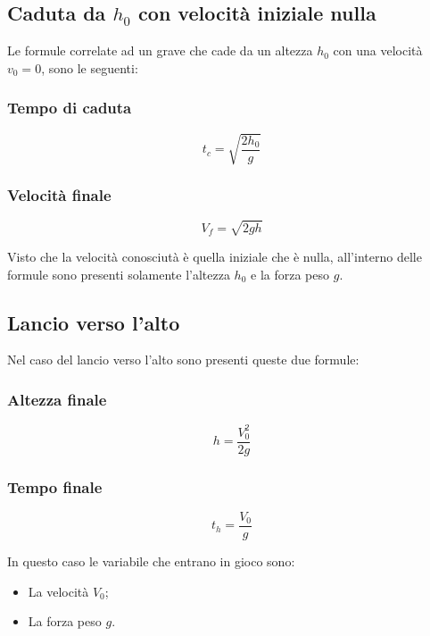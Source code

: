 \documentclass{book}
\begin{document}
\subsection{Caduta da $h_0$ con velocità iniziale nulla}
Le formule correlate ad un grave che cade da un altezza $h_0$ con una velocità $v_0=0$, sono le seguenti:
\label{sec:cadutadahconvelzero}
\begin{multicols}{2}
  \subsubsection{Tempo di caduta}
  \label{sec:tempcad}
  \begin{equation}
    \label{eq:tempcad}
    t_c=\sqrt{\frac{2h_0}{g}}
  \end{equation}
  \subsubsection{Velocità finale}
  \label{sec:velFin}
  \begin{equation}
    \label{eq:velfin}
    V_f=\sqrt{2gh}
  \end{equation}
\end{multicols}
Visto che la velocità conosciutà è quella iniziale che è nulla, all'interno delle formule sono presenti solamente l'altezza $h_0$ e la forza peso $g$.

\subsection{Lancio verso l'alto}
\label{sec:lancioversolalto}
Nel caso del lancio verso l'alto sono presenti queste due formule:
\begin{multicols}{2}
  \subsubsection{Altezza finale}
  \label{sec:altfinlancioversalt}
  \begin{equation}
    \label{eq:altfinlancioversalt}
    h=\frac{V_0^2}{2g}
  \end{equation}
  \subsubsection{Tempo finale}
  \label{sec:tempofinlancioveralt}
  \begin{equation}
    \label{eq:tempofinlancioveralt}
    t_h=\frac{V_0}{g}
  \end{equation}
\end{multicols}
In questo caso le variabile che entrano in gioco sono:
\begin{itemize}
\item La velocità $V_0$;
\item La forza peso $g$.
\end{itemize}
\end{document}
